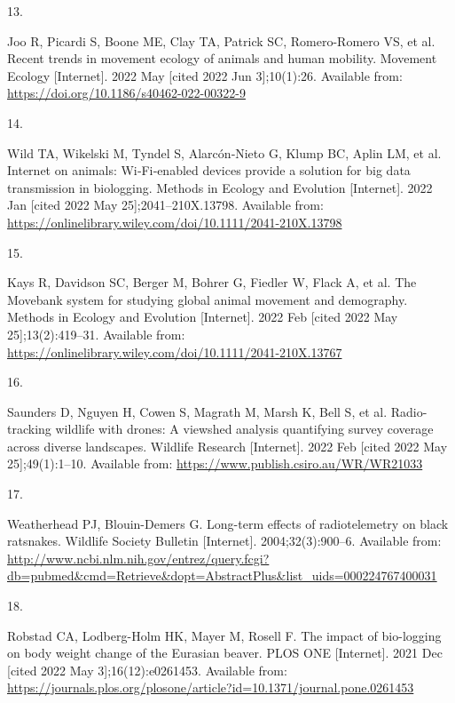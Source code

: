 \documentclass[10pt,a4paper]{article}
\newlength{\cslhangindent}
\newlength{\csllabelwidth}
\newenvironment{CSLReferences}[2] %
{\begin{list}{}{%
	\setlength{\itemindent}{0pt}
	\setlength{\leftmargin}{0pt}
	\setlength{\parsep}{0pt}
	\ifodd #1
	\setlength{\leftmargin}{\cslhangindent}
	\setlength{\itemindent}{-1\cslhangindent}
	\fi
	\setlength{\itemsep}{#2\baselineskip}}}
{\end{list}}
\newcommand{\CSLLeftMargin}[1]{\parbox[t]{\csllabelwidth}{\strut#1\strut}}
\newcommand{\CSLRightInline}[1]{\parbox[t]{\linewidth - \csllabelwidth}{\strut#1\strut}}
\begin{document}
\begin{CSLReferences}{0}{1}
\CSLLeftMargin{13. }%
\CSLRightInline{Joo R, Picardi S, Boone ME, Clay TA, Patrick SC, Romero-Romero VS, et al. Recent trends in movement ecology of animals and human mobility. Movement Ecology {[}Internet{]}. 2022 May {[}cited 2022 Jun 3{]};10(1):26. Available from: \url{https://doi.org/10.1186/s40462-022-00322-9}}

\CSLLeftMargin{14. }%
\CSLRightInline{Wild TA, Wikelski M, Tyndel S, Alarcón‐Nieto G, Klump BC, Aplin LM, et al. Internet on animals: {Wi}‐{Fi}‐enabled devices provide a solution for big data transmission in biologging. Methods in Ecology and Evolution {[}Internet{]}. 2022 Jan {[}cited 2022 May 25{]};2041--210X.13798. Available from: \url{https://onlinelibrary.wiley.com/doi/10.1111/2041-210X.13798}}

\CSLLeftMargin{15. }%
\CSLRightInline{Kays R, Davidson SC, Berger M, Bohrer G, Fiedler W, Flack A, et al. The {Movebank} system for studying global animal movement and demography. Methods in Ecology and Evolution {[}Internet{]}. 2022 Feb {[}cited 2022 May 25{]};13(2):419--31. Available from: \url{https://onlinelibrary.wiley.com/doi/10.1111/2041-210X.13767}}

\CSLLeftMargin{16. }%
\CSLRightInline{Saunders D, Nguyen H, Cowen S, Magrath M, Marsh K, Bell S, et al. Radio-tracking wildlife with drones: A viewshed analysis quantifying survey coverage across diverse landscapes. Wildlife Research {[}Internet{]}. 2022 Feb {[}cited 2022 May 25{]};49(1):1--10. Available from: \url{https://www.publish.csiro.au/WR/WR21033}}

\CSLLeftMargin{17. }%
\CSLRightInline{Weatherhead PJ, Blouin-Demers G. Long-term effects of radiotelemetry on black ratsnakes. Wildlife Society Bulletin {[}Internet{]}. 2004;32(3):900--6. Available from: \url{http://www.ncbi.nlm.nih.gov/entrez/query.fcgi?db=pubmed&cmd=Retrieve&dopt=AbstractPlus&list_uids=000224767400031}}

\CSLLeftMargin{18. }%
\CSLRightInline{Robstad CA, Lodberg-Holm HK, Mayer M, Rosell F. The impact of bio-logging on body weight change of the {Eurasian} beaver. PLOS ONE {[}Internet{]}. 2021 Dec {[}cited 2022 May 3{]};16(12):e0261453. Available from: \url{https://journals.plos.org/plosone/article?id=10.1371/journal.pone.0261453}}


\end{CSLReferences}
\end{document}
